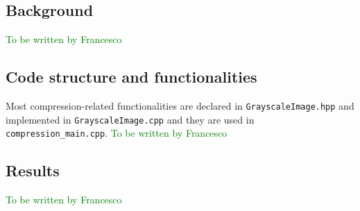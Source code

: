 \subsection{Background}
\textcolor{green}{To be written by Francesco}

\subsection{Code structure and functionalities}
Most compression-related functionalities are declared in \texttt{Grayscale\-Image.hpp} and implemented in \texttt{Grayscale\-Image.cpp} and they are used in \texttt{compression\_main.cpp}.
\textcolor{green}{To be written by Francesco}

\subsection{Results}
\textcolor{green}{To be written by Francesco}
